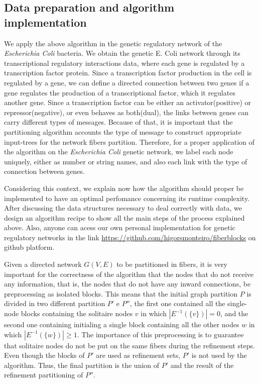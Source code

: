 \documentclass[12pt]{diazessay} %
\begin{document}

\subsection{Data preparation and algorithm implementation}

We apply the above algorithm in the genetic regulatory network of the \textit{Escherichia Coli} bacteria. We obtain the genetic E. Coli network through its transcriptional regulatory interactions data, where each gene is regulated by a transcription factor protein. Since a transcription factor production in the cell is regulated by a gene, we can define a directed connection between two genes if a gene regulates the production of a transcriptional factor, which it regulates another gene. Since a transcription factor can be either an activator(positive) or repressor(negative), or even behaves as both(dual), the links between genes can carry different types of messages. Because of that, it is important that the partitioning algorithm accounts the type of message to construct appropriate input-trees for the network fibers partition. Therefore, for a proper application of the algorithm on the \textit{Escherichia Coli} genetic network, we label each node uniquely, either as number or string names, and also each link with the type of connection between genes.

Considering this context, we explain now how the algorithm should proper be implemented to have an optimal perfomance concerning its runtime complexity. After discussing the data structures necessary to deal correctly with data, we design an algorithm recipe to show all the main steps of the process explained above. Also, anyone can acess our own personal implementation for genetic regulatory networks in the link \url{https://github.com/higorsmonteiro/fiberblocks} on github platform.

Given a directed network $G(V, E)$ to be partitioned in fibers, it is very important for the correctness of the algorithm that the nodes that do not receive any information, that is, the nodes that do not have any inward connections, be preprocessing as isolated blocks. This means that the initial graph partition $P$ is divided in two different partition $P'$ e $P''$, the first one contained all the single-node blocks containing the solitaire nodes $v$ in which $| E^{-1}(\{v\}) | = 0$, and the second one containing initialing a single block containing all the other nodes $w$ in which $| E^{-1}(\{w\}) | \geq 1$. The importance of this preprocessing is to guarantee that solitaire nodes do not be put on the same fibers during the refinement steps. Even though the blocks of $P'$ are used as refinement sets, $P'$ is not used by the algorithm. Thus, the final partition is the union of $P'$ and the result of the refinement partitioning of $P''$.
\end{document}
